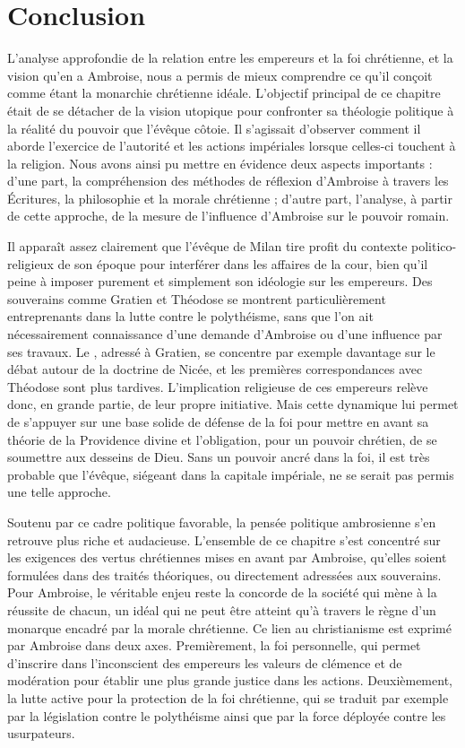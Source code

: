 \section*{Conclusion}

L'analyse approfondie de la relation entre les empereurs et la foi chrétienne, et la vision qu'en a Ambroise, nous a permis de mieux comprendre ce qu'il conçoit comme étant la monarchie chrétienne idéale. L'objectif principal de ce chapitre était de se détacher de la vision utopique pour confronter sa théologie politique à la réalité du pouvoir que l'évêque côtoie. Il s'agissait d'observer comment il aborde l’exercice de l'autorité et les actions impériales lorsque celles-ci touchent à la religion. Nous avons ainsi pu mettre en évidence deux aspects importants : d'une part, la compréhension des méthodes de réflexion d’Ambroise à travers les Écritures, la philosophie et la morale chrétienne ; d'autre part, l'analyse, à partir de cette approche, de la mesure de l'influence d'Ambroise sur le pouvoir romain.

\bigskip

Il apparaît assez clairement que l’évêque de Milan tire profit du contexte politico-religieux de son époque pour interférer dans les affaires de la cour, bien qu’il peine à imposer purement et simplement son idéologie sur les empereurs. Des souverains comme Gratien et Théodose se montrent particulièrement entreprenants dans la lutte contre le polythéisme, sans que l'on ait nécessairement connaissance d'une demande d'Ambroise ou d'une influence par ses travaux. Le , adressé à Gratien, se concentre par exemple davantage sur le débat autour de la doctrine de Nicée, et les premières correspondances avec Théodose sont plus tardives. L’implication religieuse de ces empereurs relève donc, en grande partie, de leur propre initiative. Mais cette dynamique lui permet de s'appuyer sur une base solide de défense de la foi pour mettre en avant sa théorie de la Providence divine et l’obligation, pour un pouvoir chrétien, de se soumettre aux desseins de Dieu. Sans un pouvoir ancré dans la foi, il est très probable que l'évêque, siégeant dans la capitale impériale, ne se serait pas permis une telle approche.

\bigskip

Soutenu par ce cadre politique favorable, la pensée politique ambrosienne s'en retrouve plus riche et audacieuse. L'ensemble de ce chapitre s'est concentré sur les exigences des vertus chrétiennes mises en avant par Ambroise, qu'elles soient formulées dans des traités théoriques, ou directement adressées aux souverains. Pour Ambroise, le véritable enjeu reste la concorde de la société qui mène à la réussite de chacun, un idéal qui ne peut être atteint qu'à travers le règne d'un monarque encadré par la morale chrétienne. Ce lien au christianisme est exprimé par Ambroise dans deux axes. Premièrement, la foi personnelle, qui permet d'inscrire dans l'inconscient des empereurs les valeurs de clémence et de modération pour établir une plus grande justice dans les actions. Deuxièmement, la lutte active pour la protection de la foi chrétienne, qui se traduit par exemple par la législation contre le polythéisme ainsi que par la force déployée contre les usurpateurs.

